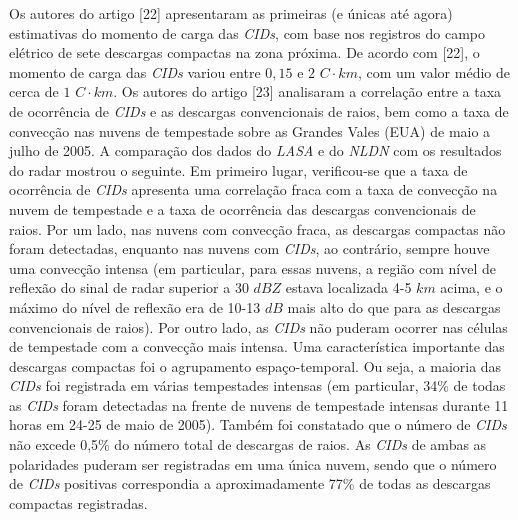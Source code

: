 \documentclass[a4paper, 12pt, onecolumn,singlespacing]{article}
\begin{document}
	Os autores do artigo [22] apresentaram as primeiras (e únicas até agora) estimativas do momento de carga das \textit{CIDs}, com base nos registros do campo elétrico de sete descargas compactas na zona próxima. De acordo com [22], o momento de carga das \textit{CIDs} variou entre $0,15$ e $2$ $C·km$, com um valor médio de cerca de $1$ $C·km$. Os autores do artigo [23] analisaram a correlação entre a taxa de ocorrência de \textit{CIDs} e as descargas convencionais de raios, bem como a taxa de convecção nas nuvens de tempestade sobre as Grandes Vales (EUA) de maio a julho de 2005. A comparação dos dados do \textit{LASA} e do \textit{NLDN} com os resultados do radar mostrou o seguinte. Em primeiro lugar, verificou-se que a taxa de ocorrência de \textit{CIDs} apresenta uma correlação fraca com a taxa de convecção na nuvem de tempestade e a taxa de ocorrência das descargas convencionais de raios. Por um lado, nas nuvens com convecção fraca, as descargas compactas não foram detectadas, enquanto nas nuvens com \textit{CIDs}, ao contrário, sempre houve uma convecção intensa (em particular, para essas nuvens, a região com nível de reflexão do sinal de radar superior a 30 $dBZ$ estava localizada 4-5 $km$ acima, e o máximo do nível de reflexão era de 10-13 $dB$ mais alto do que para as descargas convencionais de raios). Por outro lado, as \textit{CIDs} não puderam ocorrer nas células de tempestade com a convecção mais intensa. Uma característica importante das descargas compactas foi o agrupamento espaço-temporal. Ou seja, a maioria das \textit{CIDs} foi registrada em várias tempestades intensas (em particular, 34\% de todas as \textit{CIDs} foram detectadas na frente de nuvens de tempestade intensas durante 11 horas em 24-25 de maio de 2005). Também foi constatado que o número de \textit{CIDs} não excede 0,5\% do número total de descargas de raios. As \textit{CIDs} de ambas as polaridades puderam ser registradas em uma única nuvem, sendo que o número de \textit{CIDs} positivas correspondia a aproximadamente 77\% de todas as descargas compactas registradas.
	
\end{document}
